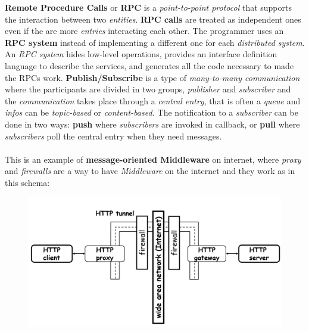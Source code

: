 \documentclass{article}
\begin{document}
\textbf{Remote Procedure Calls} or \textbf{RPC} is a \emph{point-to-point protocol} that supports the interaction between two \emph{entities}. \textbf{RPC calls} are treated as independent ones even if the are more \emph{entries} interacting each other. The programmer uses an \textbf{RPC system} instead of implementing a different one for each \emph{distributed system}. An \emph{RPC system} hides low-level operations, provides an interface definition language to describe the services, and generates all the code necessary to made the RPCs work. \textbf{Publish/Subscribe} is a type of \emph{many-to-many communication} where the participants are divided in two groups, \emph{publisher} and \emph{subscriber} and the \emph{communication} takes place through a \emph{central entry}, that is often a \emph{queue} and \emph{infos} can be \emph{topic-based} or \emph{content-based.} The notification to a \emph{subscriber} can be done in two ways: \textbf{push} where \emph{subscribers} are invoked in callback, or \textbf{pull} where \emph{subscribers} poll the central entry when they need messages.
\\\\
This is an example of \textbf{message-oriented Middleware} on internet, where \emph{proxy} and \emph{firewalls} are a way to have \emph{Middleware} on the internet and they work as in this schema:
\begin{figure}[H]
  \centering
  \includegraphics[scale=0.45]{cattura5.png}
\end{figure}
\end{document}
